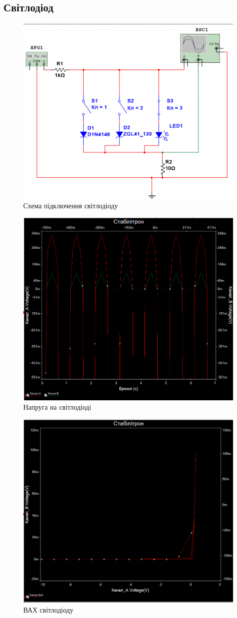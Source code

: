 \documentclass[
  ukrainian,
  14pt
]{extreport}
\begin{document}
\subsection{Світлодіод}
\begin{figure}[H]
    \centering
    \includegraphics[width=.6\textwidth]{imgs/SD-1.png}
    \caption{Схема підключення світлодіоду}
\end{figure}
\begin{figure}[H]
    \centering
    \includegraphics[width=.6\textwidth]{imgs/S-2.png}
    \caption{Напруга на світлодіоді}
\end{figure}
\begin{figure}[H]
    \centering
    \includegraphics[width=.6\textwidth]{imgs/S-3.png}
    \caption{ВАХ світлодіоду}
\end{figure}
\end{document}
